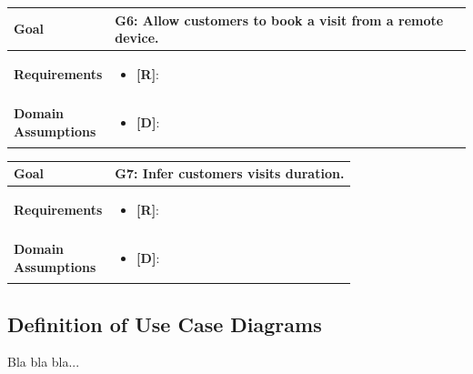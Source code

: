 \begin{table}[H]
\centering
\begin{tabular}{| m{} | m{} |} 
	\hline
	\textbf{Goal} &
		\textbf{G6: Allow customers to book a visit from a remote device.} \\
	\hline
	\textbf{Requirements} &
		\begin{itemize}
			\item {\textbf{[R]}}:
		\end{itemize} \\ 
	\hline
	\shortstack[l]{\textbf{Domain} \\ \textbf{Assumptions}} & 
		\begin{itemize}
			\item {\textbf{[D]}}:
		\end{itemize} \\ 
	\hline
\end{tabular}
\end{table}

\begin{table}[H]
\centering
\begin{tabular}{| m{} | m{} |} 
	\hline
	\textbf{Goal} &
		\textbf{G7: Infer customers visits duration.} \\
	\hline
	\textbf{Requirements} &
		\begin{itemize}
			\item {\textbf{[R]}}:
		\end{itemize} \\ 
	\hline
	\shortstack[l]{\textbf{Domain} \\ \textbf{Assumptions}} & 
		\begin{itemize}
			\item {\textbf{[D]}}:
		\end{itemize} \\ 
	\hline
\end{tabular}
\end{table}


\subsection{Definition of Use Case Diagrams}

Bla bla bla...

